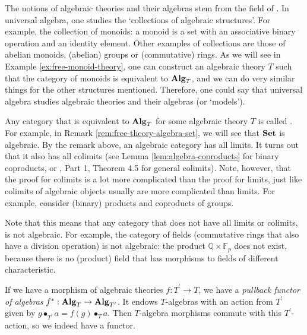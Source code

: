 \begin{remark}
  The notions of algebraic theories and their algebras stem from the field of . In universal algebra, one studies the `collections of algebraic structures'. For example, the collection of monoids: a monoid is a set with an associative binary operation and an identity element. Other examples of collections are those of abelian monoids, (abelian) groups or (commutative) rings. As we will see in Example \ref{ex:free-monoid-theory}, one can construct an algebraic theory $ T $ such that the category of monoids is equivalent to $ \mathbf{Alg}_{T} $, and we can do very similar things for the other structures mentioned. Therefore, one could say that universal algebra studies algebraic theories and their algebras (or `models').

  Any category that is equivalent to $ \mathbf{Alg}_{T} $ for some algebraic theory $ T $ is called . For example, in Remark \ref{rem:free-theory-algebra-set}, we will see that $ \mathbf{Set} $ is algebraic. By the remark above, an algebraic category has all limits. It turns out that it also has all colimits (see Lemma \ref{lem:algebra-coproducts} for binary coproducts, or \autocite{algebraic-theories-2010}, Part 1, Theorem 4.5 for general colimits). Note, however, that the proof for colimits is a lot more complicated than the proof for limits, just like colimits of algebraic objects usually are more complicated than limits. For example, consider (binary) products and coproducts of groups.

  Note that this means that any category that does not have all limits or colimits, is not algebraic. For example, the category of fields (commutative rings that also have a division operation) is not algebraic: the product $ \mathbb Q \times \mathbb F_p $ does not exist, because there is no (product) field that has morphisms to fields of different characteristic.
\end{remark}

\begin{definition}\label{def:algebra-pullback}
  If we have a morphism of algebraic theories $ f: T^\prime \to T $, we have a \textit{pullback functor of algebras} $ f^* : \mathbf{Alg}_{T} \to \mathbf{Alg}_{T^\prime} $. It endows $ T $-algebras with an action from $ T^\prime $ given by $ g \bullet_{T^\prime} a = f(g) \bullet_T a $. Then $ T $-algebra morphisms commute with this $ T^\prime $-action, so we indeed have a functor.
\end{definition}


